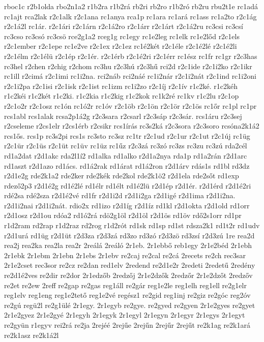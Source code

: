 {rboc1c
r2b1olda
rbo2n1a2
r1b2ra
r1b2rá
rb2ri
rb2ro
r1b2ró
rb2ru
rbu2t1e
rc1adá
rc1ajt
rca2lak
r2c1alk
r2c1ana
rc1anya
rca1p
rc1ara
rc1ará
rc1ass
rc1a2to
r2c1ág
r2c1á2l
rc1ár.
r2c1ári
r2c1árn
r2c1á2ro
r2c1árr
r2c1árt
r2c1á2ru
rc3csi
rc3csí
rc3cso
rc3csó
rc3csö
rce2g1a2
rceg1g
rc1egy
rc1e2leg
rc1elk
rc1e2lőd
r2c1els
r2c1ember
r2c1epe
rc1e2ve
r2c1ex
r2c1ez
rc1é2két
r2c1éle
r2c1é2lé
r2c1é2li
r2c1élm
r2c1élü
r2c1ép
r2c1ér.
r2c1érb
r2c1é2ri
r2c1érr
rc1ész
rc1fr
rc1gr
r2c3has
rc3hel
r2chen
r2chig
r2chom
rc3hu
r2c3hú
r2c3hű
rci2d
r2c1ide
r2c1i2ko
r2c1ikr
rc1ill
r2cimá
r2c1imi
rc1i2na.
rci2náb
rci2náé
rc1i2nár
r2c1i2nát
r2c1ind
rc1i2oni
r2c1i2pa
r2c1isi
r2c1isk
r2c1ist
rc1izm
rc1i2zo
r2c1íj
r2c1ív
r1c2ké.
r1c2kéh
r1c2kéi
r1c2két
r1c2ki.
r1c2kia
r1c2kig
r1c2kok
rc1k2ré
rc1kv
r1c2lu
r2c1op
r2c1o2r
r2c1osz
rc1ón
rc1ó2r
rc1óv
r2c1öb
r2c1ön
r2c1ör
r2c1ös
rc1őr
rc1pl
rc1pr
rcs1abl
rcs1alak
rcsa2p1á2g
r2c3sara
r2csarl
r2c3sáp
r2c3sár.
rcs1áru
r2c3sej
r2cseleme
r2cs1elr
r2cs1érb
r2csikr
rcs1írás
rc3s2ká
r2c3sora
r2c3soro
rcsóna2k1á2
rcs1ős.
rcs1p
rc3s2pi
rcs1s
rc3sto
rc3sz
rc1tr
r2c1ud
r2c1ur
r2c1ut
r2c1új
rc1üg
r2c1ür
r2c1üs
r2c1üt
rc1üv
rc1üz
rc1űz
r2c3zá
rc3zó
rc3zs
rc3zu
rc3zú
rda2cél
rd1a2dat
r2d1akc
rda2l1í2
rd1alka
rd1alko
r2d1a2nya
rda1p
rd1a2rán
r2d1arc
rd1aszt
r2d1azo
rd1ács.
rd1á2rak
rd1árat
rd1á2ron
r2d1árv
rdás1s
rd1bl
rd3dz
r2d1e2g
rde2k1a2
rde2ker
rde2kék
rde2kol
rde2k1ö2
r2d1ela
rde2sőt
rd1exp
rdező2p3
r2d1é2g
rd1é2lé
rd1élr
rd1élt
rd1é2lü
r2d1ép
r2d1ér.
r2d1érd
r2d1é2ri
rdé2sa
rdé2sza
r2d1é2vé
rd1fr
r2d1i2d
r2d1i2ga
r2d1igé
r2d1ima
r2d1i2na.
r2d1i2nai
r2d1i2nát.
rdio2x
rd1izo
r2d1íg
r2d1íz
rd1kl
r2d1okta
r2d1old
rd1orr
r2d1osz
r2d1ou
rdóa2
rd1ó2rá
rdö2g1öl
r2d1öl
r2d1ös
rd1öv
rdő2s1orr
rd1pr
r1d2ram
rd2rap
r1d2raz
rd2rog
r1d2rót
rd1sk
rd1sp
rd1st
rdsza2k1
rd1t2r
rd1udv
r2d1urá
rd1üg
r2d1üt
r2d3za
r2d3zá
rd3zo
rd3zó
r2d3zö
rd3zsí
r2d3zú
1re
rea2d
rea2j
rea2ka
rea2la
rea2r
2reálá
2reáló
2r1eb.
2r1ebbő
reb1egy
2r1e2béd
2r1ebh
2r1ebk
2r1ebm
2r1ebn
2r1ebs
2r1ebv
re2caj
re2cal
re2cá
2recets
re2ch
rec3sar
2r1e2cset
rec3sor
re2cz
re2dan
red1elv
2redend
re2d1e2r
2redeti
2redetű
2redény
re2d1é2ves
re2dir
re2dor
2r1edzőb
2redzőj
2r1e2dzők
2redzőr
2r1e2dzőt
2redzőv
re2et
re2ew
2reff
re2gap
re2gas
reg1áll
re2gár
reg1e2le
reg1elh
reg1ell
re2g1elr
reg1elv
reg1eng
reg1e2tető
reg1e2vé
regész1
re2gid
reg1inj
re2giz
re2góc
reg2óv
re2gú
regü2l
re2g1ülé
2r1egy.
2r1egyb
re2gye.
re2gyed
re2gyen
2r1e2gyes
re2gyet
2r1e2gyez
2r1e2gyé
2r1egyh
2r1egyk
2r1egyl
2r1egyn
2r1egyr
2r1egys
2r1egyt
re2gyün
r1egyv
rei2rá
re2ja
2rejéé
2rejűe
2rejűn
2rejűr
2rejűt
re2k1ag
re2k1ará
re2k1asz
re2k1á2l
}
